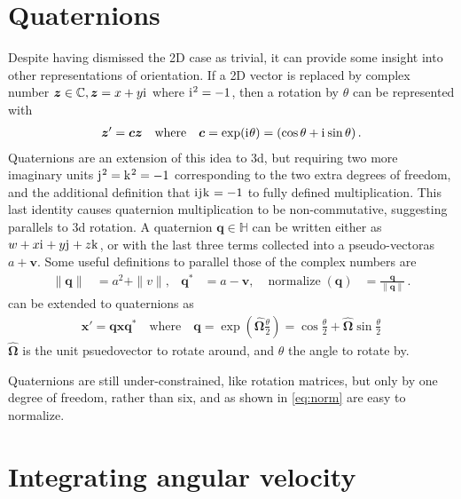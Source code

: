 \documentclass[main.tex]{subfiles}
\begin{document}
\section{Quaternions}
	\label{sec:quat:intro}

	Despite having dismissed the 2D case as trivial, it can provide some insight into other representations of orientation.
	If a 2D vector is replaced by complex number $\bm{z} \in \mathbb{C}, \bm{z} = x+y\mathrm{i}\mkern1mu$ where $\mathrm{i}\mkern1mu^2 = -1$, then a rotation by $\theta$ can be represented with
	\begin{align}
		\bm{z}' = \bm{c}\bm{z} \quad \text{where} \quad \bm{c} = \exp(\mathrm{i}\mkern1mu\theta) = (\cos \theta + \mathrm{i}\mkern1mu \sin \theta)\,.
		\label{eq:rot:complex}
	\end{align}
	Quaternions are an extension of this idea to 3d, but requiring two more imaginary units $\mathrm{j}\mkern1mu^2 = \mathrm{k}\mkern1mu^2 = -1$ corresponding to the two extra degrees of freedom, and the additional definition that $\mathrm{i}\mkern1mu\mathrm{j}\mkern1mu\mathrm{k}\mkern1mu = -1$ to fully defined multiplication.
	This last identity causes quaternion multiplication to be non-commutative, suggesting parallels to 3d rotation.
	A quaternion $\bm{q} \in \mathbb{H}$ can be written either as $w + x\mathrm{i}\mkern1mu + y\mathrm{j}\mkern1mu + z\mathrm{k}\mkern1mu$, or with the last three terms collected into a pseudo-vector\footnotemark as $a + \bm{v}$. Some useful definitions to parallel those of the complex numbers are
	\begin{align}
		\|\bm{q}\| &= a^2 + \|v\|, &
		\bm{q}^* &= a - \bm{v}, &
		\operatorname{normalize}(\bm{q}) &= \frac{\bm{q}}{\|\bm{q}\|}\,.
		\label{eq:norm}
	\end{align}
	 can be extended to quaternions as
	\begin{align}
		\bm{x}' = \bm{q} \bm{x} \bm{q}^* \quad \text{where} \quad
		\bm{q} = \exp\left(\hat{\bm{\Omega}}\tfrac{\theta}{2}\right) = \cos \tfrac{\theta}{2} + \hat{\bm{\Omega}} \sin \tfrac{\theta}{2}
		\label{eq:quat:exp}
	\end{align}
	$\hat{\bm{\Omega}}$ is the unit psuedovector to rotate around, and $\theta$ the angle to rotate by.

	Quaternions are still under-constrained, like rotation matrices, but only by one degree of freedom, rather than six, and as shown in \cref{eq:norm} are easy to normalize.

\section{Integrating angular velocity}
\label{sec:quat:int}
\end{document}

